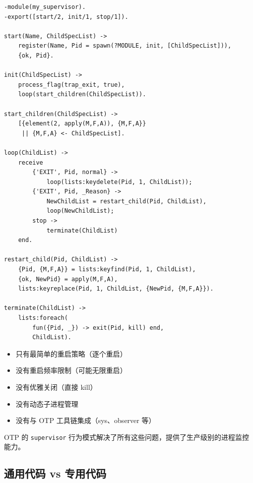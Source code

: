 \documentclass[a4paper,11pt]{article}
\begin{document}
\begin{lstlisting}[style=erlangstyle, caption={手动实现的 my\_supervisor.erl}]
-module(my_supervisor).
-export([start/2, init/1, stop/1]).

start(Name, ChildSpecList) ->
    register(Name, Pid = spawn(?MODULE, init, [ChildSpecList])),
    {ok, Pid}.

init(ChildSpecList) ->
    process_flag(trap_exit, true),
    loop(start_children(ChildSpecList)).

start_children(ChildSpecList) ->
    [{element(2, apply(M,F,A)), {M,F,A}}
     || {M,F,A} <- ChildSpecList].

loop(ChildList) ->
    receive
        {'EXIT', Pid, normal} ->
            loop(lists:keydelete(Pid, 1, ChildList));
        {'EXIT', Pid, _Reason} ->
            NewChildList = restart_child(Pid, ChildList),
            loop(NewChildList);
        stop ->
            terminate(ChildList)
    end.

restart_child(Pid, ChildList) ->
    {Pid, {M,F,A}} = lists:keyfind(Pid, 1, ChildList),
    {ok, NewPid} = apply(M,F,A),
    lists:keyreplace(Pid, 1, ChildList, {NewPid, {M,F,A}}).

terminate(ChildList) ->
    lists:foreach(
        fun({Pid, _}) -> exit(Pid, kill) end,
        ChildList).
\end{lstlisting}

\begin{notebox}[手动实现的问题]
\begin{itemize}[leftmargin=1.5em]
    \item 只有最简单的重启策略（逐个重启）
    \item 没有重启频率限制（可能无限重启）
    \item 没有优雅关闭（直接 kill）
    \item 没有动态子进程管理
    \item 没有与 OTP 工具链集成（sys、observer 等）
\end{itemize}
\end{notebox}

OTP 的 \texttt{supervisor} 行为模式解决了所有这些问题，提供了生产级别的进程监控能力。

\subsection{通用代码 vs 专用代码}
\end{document}
